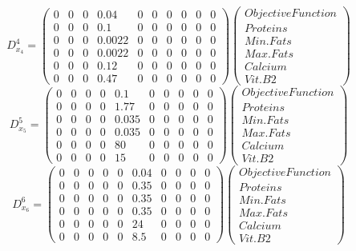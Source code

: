 \documentclass[a4paper,12pt]{article}
\begin{document}
\[
D^4_{x_4} = \begin{pmatrix}
0 & 0 & 0 & 0.04 & 0 & 0 & 0 & 0 & 0 & 0 \\ 
0 & 0 & 0 & 0.1 & 0 & 0 & 0 & 0 & 0 & 0 \\ 
0 & 0 & 0 & 0.0022 & 0 & 0 & 0 & 0 & 0 & 0 \\
0 & 0 & 0 & 0.0022 & 0 & 0 & 0 & 0 & 0 & 0 \\ 
0 & 0 & 0 & 0.12 & 0 & 0 & 0 & 0 & 0 & 0 \\ 
0 & 0 & 0 & 0.47 & 0 & 0 & 0 & 0 & 0 & 0 
\end{pmatrix}
\begin{pmatrix}
    Objective Function \\
    Proteins \\
    Min. Fats \\
    Max. Fats \\
    Calcium \\
    Vit. B2
\end{pmatrix}
\]
\[
D^5_{x_5} = \begin{pmatrix}
0 & 0 & 0 & 0 & 0.1 & 0 & 0 & 0 & 0 & 0 \\
0 & 0 & 0 & 0 & 1.77 & 0 & 0 & 0 & 0 & 0 \\
0 & 0 & 0 & 0 & 0.035 & 0 & 0 & 0 & 0 & 0 \\
0 & 0 & 0 & 0 & 0.035 & 0 & 0 & 0 & 0 & 0 \\ 
0 & 0 & 0 & 0 & 80 & 0 & 0 & 0 & 0 & 0 \\ 
0 & 0 & 0 & 0 & 15 & 0 & 0 & 0 & 0 & 0 
\end{pmatrix}
\begin{pmatrix}
    Objective Function \\
    Proteins \\
    Min. Fats \\
    Max. Fats \\
    Calcium \\
    Vit. B2
\end{pmatrix}
\]
\[
D^6_{x_6} = \begin{pmatrix}
0 & 0 & 0 & 0 & 0 & 0.04 & 0 & 0 & 0 & 0 \\ 
0 & 0 & 0 & 0 & 0 & 0.35 & 0 & 0 & 0 & 0 \\ 
0 & 0 & 0 & 0 & 0 & 0.35 & 0 & 0 & 0 & 0 \\ 
0 & 0 & 0 & 0 & 0 & 0.35 & 0 & 0 & 0 & 0 \\
0 & 0 & 0 & 0 & 0 & 24 & 0 & 0 & 0 & 0 \\ 
0 & 0 & 0 & 0 & 0 & 8.5 & 0 & 0 & 0 & 0 
\end{pmatrix}
\begin{pmatrix}
    Objective Function \\
    Proteins \\
    Min. Fats \\
    Max. Fats \\
    Calcium \\
    Vit. B2
\end{pmatrix}
\]
\end{document}
